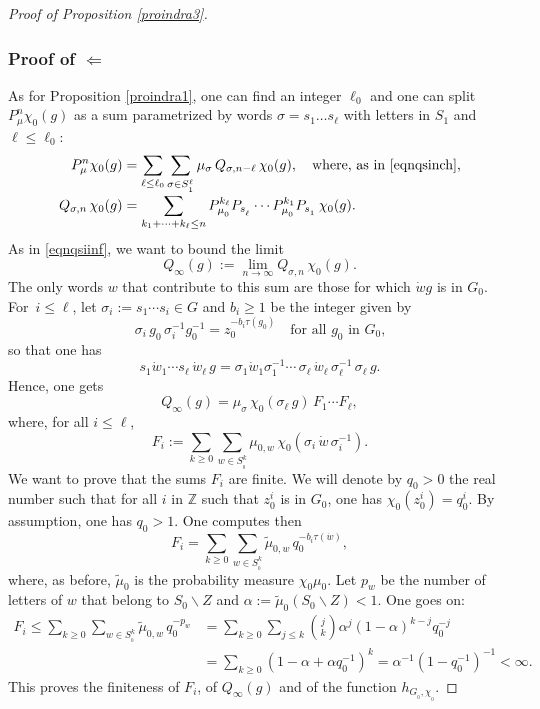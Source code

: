 \documentclass[11pt]{article}
\numberwithin{equation}{section}
\theoremstyle{definition}
\newcommand{\m}[1]{\mathbb{ #1}}
\let\al\alpha
\let\si\sigma
\let\ra\to
\begin{document}
\begin{proof}[Proof of Proposition \ref{proindra3}]
\subsubsection*{Proof of $\Leftarrow$}
As for Proposition \ref{proindra1},
one can find an integer $\ell_0$ and one can split $P^n_\mu\chi_0(g)$
as a sum parametrized by words $\si=s_1\ldots s_\ell$ with letters in $S_1$
and $\ell\leq \ell_0$:\vspace*{-3pt}
\begin{align*}
P^n_\mu\chi_0(g)
&=
\sum_{\ell\leq \ell_0}\sum_{\si\in S_{_1}^\ell}
\mu_\si\,Q_{\si,n-\ell}\,\chi_0(g),
\quad\text{where, as in \eqref{eqnqsinch},}\\[-3pt]
Q_{\si,n}\,\chi_0(g)
&=
\sum_{k_1+\cdots +k_\ell\leq n}
P^{k_\ell}_{\mu_{_0}}P_{s_{_\ell}}\cdots
P^{k_1}_{\mu_{_0}}P_{s_{_1}}\,\chi_0(g).
\end{align*}
As in \eqref{eqnqsiinf}, we want to bound the limit\vspace*{-3pt}
\[
Q_\infty(g)
:=
\lim_{n\ra\infty}
Q_{\si,n}\,\chi_0(g).
\]
The only words $w$ that contribute to this sum are those for which
$\dot{w}g$ is in $G_0$.
For~$i\leq \ell$, let $\si_i:=s_1\cdots s_i\in G$ and $b_i\geq 1$ be the integer given by\vspace*{-3pt}
\[
\si_i\,g_0\,\si_i^{-1}g_0^{-1}=z_0^{-b_i\tau(g_0)}
\quad\text{for all $g_0$ in $G_0$,}
\]
so that one has\vspace*{-3pt}
\begin{equation}
\label{eqnswswg2}
s_1\dot{w}_{1}\cdots s_\ell\, \dot{w}_{\ell}\, g
=
\si_1\dot{w}_{1}\si_1^{-1}\cdots\, \si_{\ell}\,\dot{w}_{\ell}\,\si_\ell^{-1}\,\si_\ell\, g.
\end{equation}
Hence, one gets\vspace*{-3pt}
\[
Q_\infty(g)
=\mu_\si\,\chi_0(\si_\ell\, g)\,F_1\cdots F_\ell,
\]
where, for all $i\leq \ell$,\vspace*{-3pt}
\[
F_i:=
\sum_{k\geq 0}
\sum_{w\in S^{k}_{_0}}
\mu_{0,w}\, \chi_0(\si_i\, \dot{w}\,\si^{-1}_i).
\]
We want to prove that the sums $F_i$ are finite.
We will denote by $q_0>0$ the real number such that
for all $i$ in $\m Z$ such that $z_0^i$ is in $G_0$, one has
$\chi_0(z_0^i)=q_0^i.$
By assumption, one has $q_0>1$. One computes then\vspace*{-3pt}
\[
F_i
=
\sum_{k\geq 0}
\sum_{w\in S^{k}_{_0}}
\widetilde{\mu}_{0,w}\, q_0^{-b_i\tau(\dot{w})},
\]
where, as before, $\widetilde{\mu}_0$ is the probability
measure $\chi_0\mu_0$.
Let $p_w$ be the number of letters of $w$ that belong to $S_0\smallsetminus Z$
and $\al:=\widetilde{\mu}_0(S_0\smallsetminus Z)<1$.
One goes on:\vspace*{-3pt}
\begin{align*}
F_i
\leq
\sum_{k\geq 0}
\sum_{w\in S^{k}_{_0}}
\widetilde{\mu}_{0,w}\, q_0^{-p_w}
&=\sum_{k\geq 0}
\sum_{j\leq k}
\binom{j}{k}\al^j(1-\al )^{k-j}q_0^{-j}\\[-3pt]
&=
\sum_{k\geq 0}
(1-\al+\al q_0^{-1})^k
= \al^{-1}(1-q_0^{-1})^{-1}< \infty.
\end{align*}
This proves the finiteness of $F_i$, of $Q_\infty(g)$ and of the function $h_{G_{_0},\chi_{_0}}$.
\end{proof}
\end{document}
